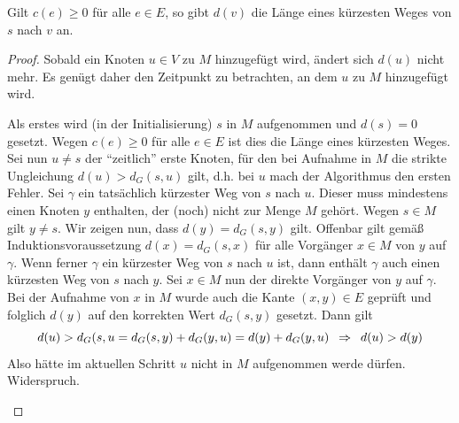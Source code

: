 \begin{aussage}
	Gilt $c(e) \ge 0$ für alle $e \in E$, so gibt $d(v)$ die Länge eines kürzesten Weges von $s$ nach $v$ an.
\end{aussage}
\begin{proof}
	Sobald ein Knoten $u \in V$ zu $M$ hinzugefügt wird, ändert sich $d(u)$ nicht mehr. Es genügt daher den Zeitpunkt zu betrachten, an dem $u$ zu $M$ hinzugefügt wird.
	\begin{induction}
		\ianfang Als erstes wird (in der Initialisierung) $s$ in $M$ aufgenommen und $d(s) = 0$ gesetzt. Wegen $c(e) \ge 0$ für alle $e \in E$ ist dies die Länge eines kürzesten Weges.
		\ischritt Sei nun $u \neq s$ der \enquote{zeitlich} erste Knoten, für den bei Aufnahme in $M$ die strikte Ungleichung $d(u) > d_G(s,u)$ gilt, d.h. bei $u$ mach der Algorithmus den ersten Fehler. Sei $\gamma$ ein tatsächlich kürzester Weg von $s$ nach $u$. Dieser muss mindestens einen Knoten $y$ enthalten, der (noch) nicht zur Menge $M$ gehört. Wegen $s \in M$ gilt $y \neq s$. Wir zeigen nun, dass $d(y) = d_G(s,y)$ gilt. Offenbar gilt gemäß Induktionsvoraussetzung $d(x) = d_G(s,x)$ für alle Vorgänger $x \in M$ von $y$ auf $\gamma$. Wenn ferner $\gamma$ ein kürzester Weg von $s$ nach $u$ ist, dann enthält $\gamma$ auch einen kürzesten Weg von $s$ nach $y$. Sei $x \in M$ nun der direkte Vorgänger von $y$ auf $\gamma$. Bei der Aufnahme von $x$ in $M$ wurde auch die Kante $(x,y) \in E$ geprüft und folglich $d(y)$ auf den korrekten Wert $d_G(s,y)$ gesetzt. Dann gilt
		\begin{equation*}
			d(u) > d_G(s,u = d_G(s,y) + d_G(y,u) = d(y) + d_G(y,u) \enskip \Rightarrow \enskip d(u) > d(y)
		\end{equation*}
		Also hätte im aktuellen Schritt $u$ nicht in $M$ aufgenommen werde dürfen. Widerspruch.
	\end{induction}
\end{proof}

